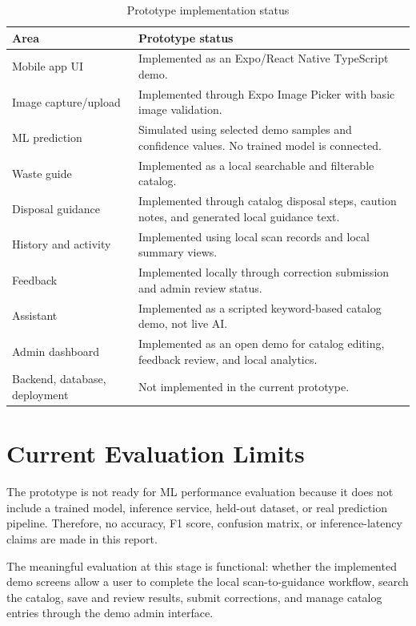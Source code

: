 \documentclass[12pt,a4paper]{report}
\begin{document}
\begin{table}[htbp]
\centering
\small
\renewcommand{\arraystretch}{1.15}
\begin{tabularx}{\textwidth}{|>{\raggedright\arraybackslash}p{}|>{\raggedright\arraybackslash}X|}
  \hline
  \textbf{Area} & \textbf{Prototype status} \\
  \hline
  Mobile app UI & Implemented as an Expo/React Native TypeScript demo. \\
  \hline
  Image capture/upload & Implemented through Expo Image Picker with basic image validation. \\
  \hline
  ML prediction & Simulated using selected demo samples and confidence values. No trained model is connected. \\
  \hline
  Waste guide & Implemented as a local searchable and filterable catalog. \\
  \hline
  Disposal guidance & Implemented through catalog disposal steps, caution notes, and generated local guidance text. \\
  \hline
  History and activity & Implemented using local scan records and local summary views. \\
  \hline
  Feedback & Implemented locally through correction submission and admin review status. \\
  \hline
  Assistant & Implemented as a scripted keyword-based catalog demo, not live AI. \\
  \hline
  Admin dashboard & Implemented as an open demo for catalog editing, feedback review, and local analytics. \\
  \hline
  Backend, database, deployment & Not implemented in the current prototype. \\
  \hline
\end{tabularx}
\caption{Prototype implementation status}
\label{tab:prototype-status}
\end{table}

\section{Current Evaluation Limits}

The prototype is not ready for ML performance evaluation because it does not include a trained model, inference service, held-out dataset, or real prediction pipeline. Therefore, no accuracy, F1 score, confusion matrix, or inference-latency claims are made in this report.

The meaningful evaluation at this stage is functional: whether the implemented demo screens allow a user to complete the local scan-to-guidance workflow, search the catalog, save and review results, submit corrections, and manage catalog entries through the demo admin interface.
\end{document}
